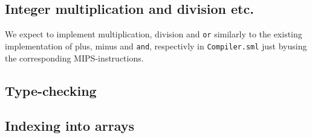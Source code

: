 \documentclass{article}
\begin{document}
\subsection{Integer multiplication and division etc.}
We expect to implement multiplication, division and \texttt{or} similarly to the existing implementation of plus, minus and \texttt{and}, respectivly in \texttt{Compiler.sml} just byusing the corresponding MIPS-instructions.
\subsection{Type-checking}

\subsection{Indexing into arrays}
\end{document}

